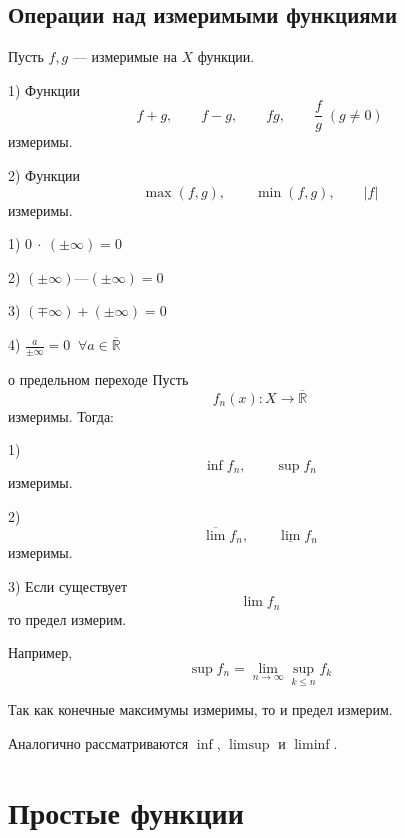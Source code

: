 \documentclass[12pt,a4paper]{article}
\begin{document}
\subsection{Операции над измеримыми функциями}

Пусть $f,g$ --- измеримые на $X$ функции.

\begin{props}

    1) Функции
    \[
        f+g,\qquad f-g,\qquad fg,\qquad \frac fg\;(g\neq0)
    \]
    измеримы.

    2) Функции
    \[
        \max(f,g),\qquad \min(f,g),\qquad |f|
    \]
    измеримы.

\end{props}

\begin{note}

    1) $0 \: \cdot \: (\pm\infty) = 0$

    2) $(\pm\infty) — (\pm\infty) = 0$

    3) $(\mp\infty) + (\pm\infty) = 0$

    4) $\frac{a}{\pm\infty} = 0 \;\; \forall a \in \overline{\mathbb{R}}$

\end{note}

\begin{theorem}{о предельном переходе}
    Пусть
    \[
        f_n(x):X\to\overline{\mathbb{R}}
    \]
    измеримы. Тогда:

    1)
    \[
        \inf f_n,\qquad \sup f_n
    \]
    измеримы.

    2)
    \[
        \overline{\lim} f_n,\qquad \underline{\lim} f_n
    \]
    измеримы.

    3) Если существует
    \[
        \lim f_n
    \]
    то предел измерим.
\end{theorem}

\begin{proofbox}{}
    Например,
    \[
        \sup f_n
        =
        \lim_{n\to\infty}\sup_{k\leq n}f_k
    \]

    Так как конечные максимумы измеримы, то и предел измерим.

    Аналогично рассматриваются $\inf$, $\limsup$ и $\liminf$.
\end{proofbox}

\newpage

\section{Простые функции}
\end{document}
